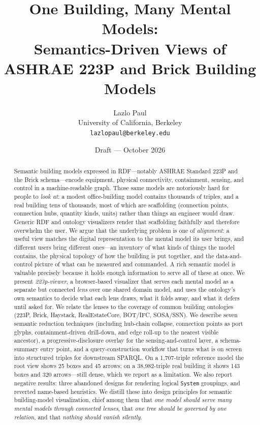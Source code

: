 \documentclass[10pt,twocolumn]{article}
\title{One Building, Many Mental Models:\\
Semantics-Driven Views of ASHRAE 223P and Brick Building Models}
\author{Lazlo Paul\\
University of California, Berkeley\\
\texttt{lazlopaul@berkeley.edu}}
\date{Draft --- October 2026}
\newcommand{\pred}[1]{\texttt{#1}}   %
\begin{document}
\maketitle

\begin{abstract}
Semantic building models expressed in RDF---notably ASHRAE Standard 223P and the
Brick schema---encode equipment, physical connectivity, containment, sensing, and
control in a machine-readable graph. Those same models are notoriously hard for
people to \emph{look at}: a modest office-building model contains thousands of
triples, and a real building tens of thousands, most of which are scaffolding
(connection points, connection hubs, quantity kinds, units) rather than things an
engineer would draw. Generic RDF and ontology visualizers render that scaffolding
faithfully and therefore overwhelm the user. We argue that the underlying problem
is one of \emph{alignment}: a useful view matches the digital representation to
the mental model its user brings, and different users bring different ones---an
inventory of what kinds of things the model contains, the physical topology of
how the building is put together, and the data-and-control picture of what can be
measured and commanded. A rich semantic model is valuable precisely because it
holds enough information to serve all of these at once. We present
\emph{223p-viewer}, a browser-based visualizer that serves each mental model as a
separate but connected \emph{lens} over one shared domain model, and uses the
ontology's own semantics to decide what each lens draws, what it folds away, and
what it defers until asked for. We relate the lenses to the coverage of common
building ontologies (223P, Brick, Haystack, RealEstateCore, BOT/IFC, SOSA/SSN).
We describe seven semantic reduction techniques (including
hub-chain collapse, connection points as port glyphs, containment-driven drill-down,
and edge roll-up to the nearest visible ancestor), a progressive-disclosure
overlay for the sensing-and-control layer, a schema-summary entry point, and a
query-construction workflow that turns what is on screen into structured triples
for downstream SPARQL. On a 1{,}707-triple reference model the root view shows 25
boxes and 45 arrows; on a 38{,}982-triple real building it shows 143 boxes and 320
arrows---still dense, which we report as a limitation. We also report negative
results: three abandoned designs for rendering logical \pred{System} groupings, and
reverted name-based heuristics. We distill these into design principles for
semantic building-model visualization, chief among them that \emph{one model should serve
many mental models through connected lenses}, that \emph{one tree should be
governed by one relation}, and that \emph{nothing should vanish silently}.
\end{abstract}
\end{document}
